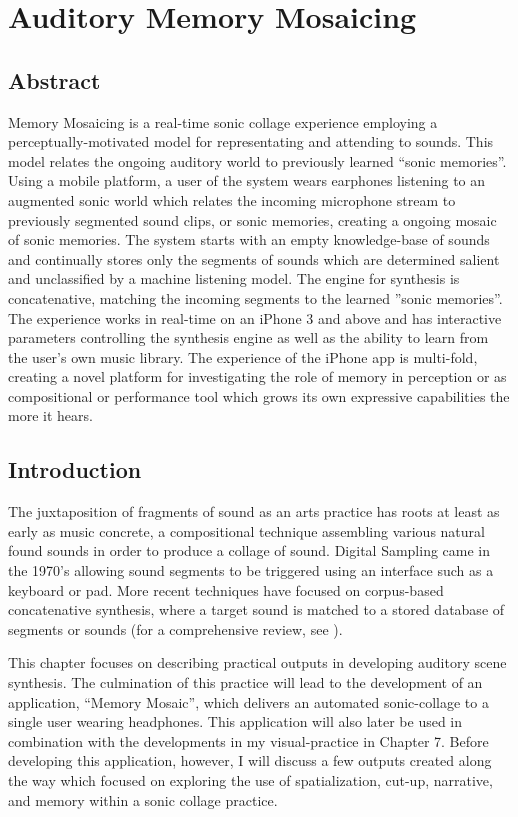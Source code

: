 
\chapter{Auditory Memory Mosaicing}

\minitoc

\section{Abstract}

Memory Mosaicing is a real-time sonic collage experience employing a perceptually-motivated model for representating and attending to sounds. This model relates the ongoing auditory world to previously learned ``sonic memories''.  Using a mobile platform, a user of the system wears earphones listening to an augmented sonic world which relates the incoming microphone stream to previously segmented sound clips, or sonic memories, creating a ongoing mosaic of sonic memories.  The system starts with an empty knowledge-base of sounds and continually stores only the segments of sounds which are determined salient and unclassified by a machine listening model.  The engine for synthesis is concatenative, matching the incoming segments to the learned ''sonic memories''.  The experience works in real-time on an iPhone 3 and above and has interactive parameters controlling the synthesis engine as well as the ability to learn from the user's own music library.  The experience of the iPhone app is multi-fold, creating a novel platform for investigating the role of memory in perception or as compositional or performance tool which grows its own expressive capabilities the more it hears.

\section{Introduction}

The juxtaposition of fragments of sound as an arts practice has roots at least as early as music concrete, a compositional technique assembling various natural found sounds in order to produce a collage of sound.  Digital Sampling came in the 1970's allowing sound segments to be triggered using an interface such as a keyboard or pad.  More recent techniques have focused on corpus-based concatenative synthesis, where a target sound is matched to a stored database of segments or sounds (for a comprehensive review, see \cite{Schwarz2006}).  

This chapter focuses on describing practical outputs in developing auditory scene synthesis.  The culmination of this practice will lead to the development of an application, ``Memory Mosaic'', which delivers an automated sonic-collage to a single user wearing headphones.  This application will also later be used in combination with the developments in my visual-practice in Chapter 7.   Before developing this application, however, I will discuss a few outputs created along the way which focused on exploring the use of spatialization, cut-up, narrative, and memory within a sonic collage practice.  


